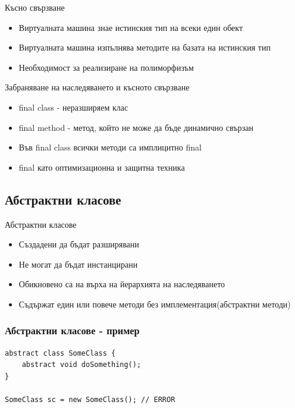 \documentclass{beamer}
\begin{document}
\begin{frame}{Късно свързване}
  \transdissolve
  \begin{itemize}
  \item Виртуалната машина знае истинския тип на всеки един обект \pause
  \item Виртуалната машина изпълнява методите на базата на истинския
    тип \pause
  \item Необходимост за реализиране на полиморфизъм
  \end{itemize}
\end{frame}

\begin{frame}{Забраняване на наследяването и късното свързване}
  \transdissolve
  \begin{itemize}
  \item final class - неразширяем клас \pause
  \item final method - метод, който не може да бъде динамично свързан \pause
  \item Във final class всички методи са имплицитно final \pause
  \item final като оптимизационна и защитна техника
  \end{itemize}
\end{frame}

\subsection{Абстрактни класове}
\begin{frame}{Абстрактни класове}
  \transdissolve
  \begin{itemize}
  \item Създадени да бъдат разширявани \pause
  \item Не могат да бъдат инстанцирани \pause
  \item Обикновено са на върха на йерархията на наследяването \pause
  \item Съдържат един или повече методи без имплементация(абстрактни методи)
  \end{itemize}
\end{frame}

\begin{frame}[fragile]
  \frametitle{Абстрактни класове - пример}
  \transdissolve
\begin{lstlisting}
abstract class SomeClass {
    abstract void doSomething();
}

SomeClass sc = new SomeClass(); // ERROR
\end{lstlisting}
\end{frame}
\end{document}
